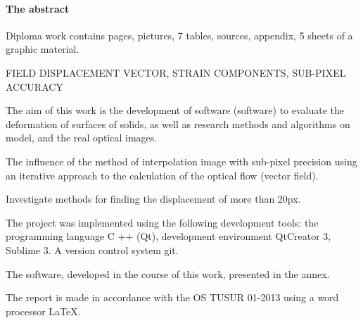 \newpage
{}
\paragraph{\hfill The abstract \hfill}
Diploma work contains  pages,  pictures, 7 tables,  sources,  appendix, 5 sheets of a graphic material.

FIELD DISPLACEMENT VECTOR, STRAIN COMPONENTS, SUB-PIXEL ACCURACY

The aim of this work is the development of software (software) to evaluate the deformation of surfaces of solids, as well as research methods and algorithms on model, and the real optical images.

The influence of the method of interpolation image with sub-pixel precision using an iterative approach to the calculation of the optical flow (vector field).

Investigate methods for finding the displacement of more than 20px.


The project was implemented using the following development tools: the programming language C ++ (Qt), development environment QtCreator 3, Sublime 3. A version control system git.

The software, developed in the course of this work, presented in the annex.

The report is made in accordance with the OS TUSUR 01-2013 using a word processor \LaTeX.
